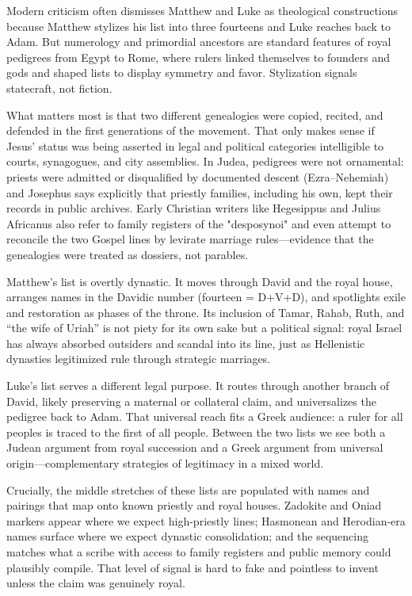 Modern criticism often dismisses Matthew and Luke as theological constructions because Matthew stylizes his list into three fourteens and Luke reaches back to Adam.
But numerology and primordial ancestors are standard features of royal pedigrees from Egypt to Rome, where rulers linked themselves to founders and gods and shaped lists to display symmetry and favor.
Stylization signals statecraft, not fiction.

What matters most is that two different genealogies were copied, recited, and defended in the first generations of the movement.
That only makes sense if Jesus’ status was being asserted in legal and political categories intelligible to courts, synagogues, and city assemblies.
In Judea, pedigrees were not ornamental: priests were admitted or disqualified by documented descent (Ezra--Nehemiah) and Josephus says explicitly that priestly families, including his own, kept their records in public archives.
Early Christian writers like Hegesippus and Julius Africanus also refer to family registers of the "desposynoi" \cite[3.19--20]{eusebius:he} and even attempt to reconcile the two Gospel lines by levirate marriage rules---evidence that the genealogies were treated as dossiers, not parables.

Matthew’s list is overtly dynastic.
It moves through David and the royal house, arranges names in the Davidic number (fourteen = D+V+D), and spotlights exile and restoration as phases of the throne.
Its inclusion of Tamar, Rahab, Ruth, and “the wife of Uriah” is not piety for its own sake but a political signal: royal Israel has always absorbed outsiders and scandal into its line, just as Hellenistic dynasties legitimized rule through strategic marriages.

Luke’s list serves a different legal purpose.
It routes through another branch of David, likely preserving a maternal or collateral claim, and universalizes the pedigree back to Adam.
That universal reach fits a Greek audience: a ruler for all peoples is traced to the first of all people.
Between the two lists we see both a Judean argument from royal succession and a Greek argument from universal origin---complementary strategies of legitimacy in a mixed world.

Crucially, the middle stretches of these lists are populated with names and pairings that map onto known priestly and royal houses.
Zadokite and Oniad markers appear where we expect high-priestly lines; Hasmonean and Herodian-era names surface where we expect dynastic consolidation; and the sequencing matches what a scribe with access to family registers and public memory could plausibly compile.
That level of signal is hard to fake and pointless to invent unless the claim was genuinely royal.

